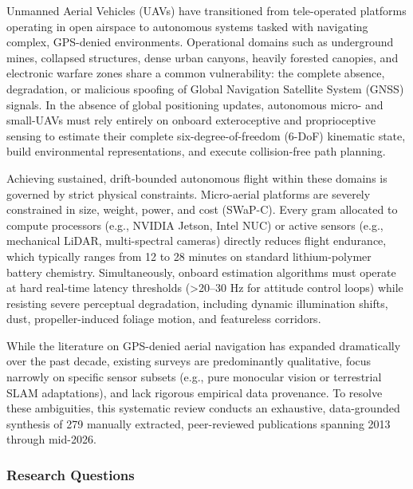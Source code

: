 \documentclass[journal]{IEEEtran}
\begin{document}
Unmanned Aerial Vehicles (UAVs) have transitioned from tele-operated
platforms operating in open airspace to autonomous systems tasked with
navigating complex, GPS-denied environments. Operational domains such as
underground mines, collapsed structures, dense urban canyons, heavily
forested canopies, and electronic warfare zones share a common
vulnerability: the complete absence, degradation, or malicious spoofing
of Global Navigation Satellite System (GNSS) signals. In the absence of
global positioning updates, autonomous micro- and small-UAVs must rely
entirely on onboard exteroceptive and proprioceptive sensing to estimate
their complete six-degree-of-freedom (6-DoF) kinematic state, build
environmental representations, and execute collision-free path planning.

Achieving sustained, drift-bounded autonomous flight within these
domains is governed by strict physical constraints. Micro-aerial
platforms are severely constrained in size, weight, power, and cost
(SWaP-C). Every gram allocated to compute processors (e.g., NVIDIA
Jetson, Intel NUC) or active sensors (e.g., mechanical LiDAR,
multi-spectral cameras) directly reduces flight endurance, which
typically ranges from 12 to 28 minutes on standard lithium-polymer
battery chemistry. Simultaneously, onboard estimation algorithms must
operate at hard real-time latency thresholds (\textgreater20--30 Hz for
attitude control loops) while resisting severe perceptual degradation,
including dynamic illumination shifts, dust, propeller-induced foliage
motion, and featureless corridors.

While the literature on GPS-denied aerial navigation has expanded
dramatically over the past decade, existing surveys are predominantly
qualitative, focus narrowly on specific sensor subsets (e.g., pure
monocular vision or terrestrial SLAM adaptations), and lack rigorous
empirical data provenance. To resolve these ambiguities, this systematic
review conducts an exhaustive, data-grounded synthesis of 279 manually
extracted, peer-reviewed publications spanning 2013 through mid-2026.

\subsubsection{Research Questions}\label{research-questions}
\end{document}
